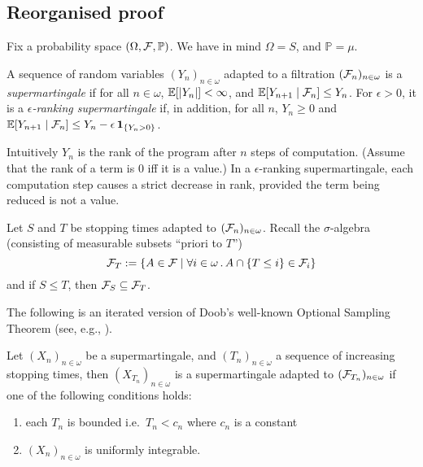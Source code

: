 \subsection*{Reorganised proof}

Fix a probability space $(\Omega, \mathcal{F}, \mathbb{P})$. 
We have in mind $\Omega = S$, and $\mathbb{P} = \mu$.

\begin{definition}\rm
A sequence of random variables $(Y_n)_{n \in \omega}$ adapted to a filtration $(\mathcal{F}_n)_{n \in \omega}$ is a \emph{supermartingale} if for all $n \in \omega$, $\mathbb{E}[|Y_n|] < \infty$, and $\mathbb{E}[Y_{n+1} \mid \mathcal{F}_n] \leq Y_n$.
For $\epsilon > 0$, it is a \emph{$\epsilon$-ranking supermartingale} if, in addition, for all $n$, $Y_n \geq 0$ and $\mathbb{E}[Y_{n+1} \mid \mathcal{F}_n] \leq Y_n - \epsilon \, \mathbf{1}_{\{Y_n > 0\}}$.
\citep{DBLP:conf/popl/FioritiH15,DBLP:conf/popl/ChatterjeeFNH16}
\end{definition}

Intuitively $Y_n$ is the rank of the program after $n$ steps of computation.
(Assume that the rank of a term is 0 iff it is a value.) In a $\epsilon$-ranking supermartingale, each computation step causes a strict decrease in rank, provided the term being reduced is not a value.

Let $S$ and $T$ be stopping times adapted to $(\mathcal{F}_n)_{n \in \omega}$.
Recall the $\sigma$-algebra (consisting of measurable subsets ``priori to $T$'')
\[
\mathcal{F}_T := \{A \in \mathcal{F} \mid \forall i \in \omega \, . \, A \cap \{T \leq i\} \in \mathcal{F}_i\}
\]
and if $S \leq T$, then $\mathcal{F}_S \subseteq \mathcal{F}_{T}$.

The following is an iterated version of Doob's well-known Optional Sampling Theorem (see, e.g., \cite[\S 6.7]{AshDD00}).
\begin{theorem}
\label{thm:optional sampling}
Let $(X_n)_{n\in \omega}$ be a supermartingale, and $(T_n)_{n \in \omega}$ a sequence of increasing stopping times, then $(X_{T_n})_{n \in \omega}$ is a supermartingale adapted to $(\mathcal{F}_{T_n})_{n \in \omega}$ if one of the following conditions holds:
\begin{enumerate}
\item each $T_n$ is bounded i.e.~$T_n < c_n$ where $c_n$ is a constant
\item $(X_n)_{n\in \omega}$ is uniformly integrable.
\end{enumerate}
\end{theorem}

